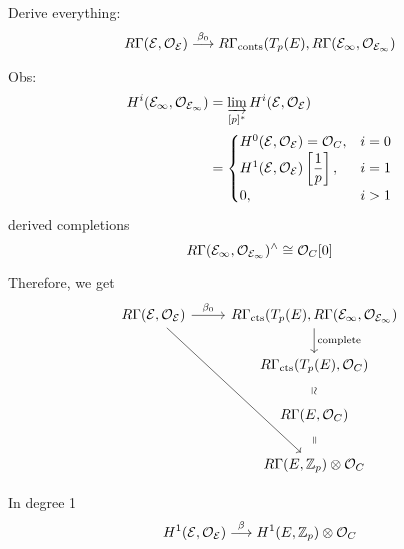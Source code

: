Derive everything:
	\[
	R\Gamma(\mathcal{E},\mathcal{O}_{\mathcal{E}}) \stackrel{\beta_0}{\longrightarrow} R\Gamma_{\text{conts}}(T_p(E), R\Gamma(\mathcal{E}_\infty, \mathcal{O}_{\mathcal{E}_\infty})
	\]


Obs:
	\[
	\begin{aligned}
	H^i(\mathcal{E}_\infty, \mathcal{O}_{\mathcal{E}_\infty})&= \varinjlim_{[p]^*} H^i(\mathcal{E},\mathcal{O}_{\mathcal{E}}) \\
	&= \begin{cases}
	H^0(\mathcal{E},\mathcal{O}_{\mathcal{E}})= \mathcal{O}_C, & i=0 \\
	H^1(\mathcal{E},\mathcal{O}_{\mathcal{E}})\left[\dfrac{1}{p}\right], & i=1 \\
	0, & i>1
	\end{cases}
	\end{aligned}
	\]
derived completions
	\[
	R\Gamma(\mathcal{E}_\infty,\mathcal{O}_{\mathcal{E}_\infty})^\wedge \cong \mathcal{O}_C[0]
	\]

Therefore, we get
	\[
	\begin{tikzcd}
	R\Gamma(\E,\O_\E) \arrow{r}{\beta_0} \arrow{rddd} & R\Gamma_{\text{cts}}(T_p(E), R\Gamma(\E_\infty, \O_{\E_\infty}) \arrow{d}{\text{complete}} \\
	& R\Gamma_{\text{cts}}(T_p(E),\O_C) \arrow[draw=none]{d}[sloped,auto=false]{\simeq} \\
	& R\Gamma(E, \O_C) \arrow[draw=none]{d}[sloped,auto=false]{=} \\
	& R\Gamma(E,\Z_p) \otimes \O_C
	\end{tikzcd}
	\]

In degree 1
	\[
	H^1(\mathcal{E},\mathcal{O}_{\mathcal{E}}) \stackrel{\beta}{\longrightarrow} H^1(E,\mathbb{Z}_p) \otimes \mathcal{O}_C
	\]












